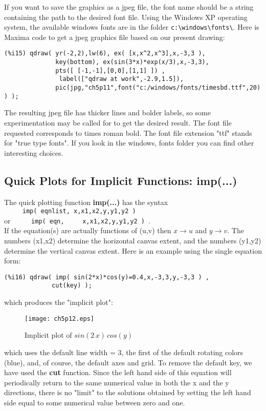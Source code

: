 \documentclass[12pt]{article}
\begin{document}
\smallskip
If you want to save the graphics as a jpeg file, the font name should be
  a string containing the path to the desired font file.
Using the Windows XP operating system, the available windows fonts are in
  the folder \verb|c:\windows\fonts\|.
Here is Maxima code to get a jpeg graphics file based on our present drawing:
\small
\begin{verbatim}
(%i15) qdraw( yr(-2,2),lw(6), ex( [x,x^2,x^3],x,-3,3 ),
              key(bottom), ex(sin(3*x)*exp(x/3),x,-3,3),
              pts([ [-1,-1],[0,0],[1,1] ]) ,
               label(["qdraw at work",-2.9,1.5]),
              pic(jpg,"ch5p11",font("c:/windows/fonts/timesbd.ttf",20) ) );
\end{verbatim}
\normalsize
The resulting jpeg file has thicker lines and bolder labels, so some experimentation
  may be called for to get the desired result.
The font file requested corresponds to times roman bold.
The font file extension "ttf" stands for "true type fonts".
If you look in the windows, fonts folder you can find other interesting
  choices.
\newpage

\subsection{Quick Plots for Implicit Functions: imp(...) }
The quick plotting function \textbf{imp(...)} has the syntax\\
\verb|     imp( eqnlist, x,x1,x2,y,y1,y2 ) | \\
 or \verb|     imp( eqn,     x,x1,x2,y,y1,y2 ) |.\\
If the equation(s) are actually functions of (u,v) then $x \rightarrow u$ and
  $y \rightarrow v$.
The numbers (x1,x2) determine the horizontal canvas extent, and the
  numbers (y1,y2) determine the vertical canvas extent.
\smallskip
Here is an example using the single equation form:
\small
\begin{verbatim}
(%i16) qdraw( imp( sin(2*x)*cos(y)=0.4,x,-3,3,y,-3,3 ) ,
             cut(key) );
\end{verbatim}
\normalsize
which produces the "implicit plot":

\begin{figure} [h]
   \centerline{\texttt{[image: ch5p12.eps]} }
	\caption{ Implicit plot of $sin(2\,x)\,cos(y)$ }
\end{figure}      
which uses the default line width = 3, the first of the default rotating colors (blue),
  and, of course, the default axes and grid.
To remove the default key, we have used the \textbf{cut} function.
Since the left hand side of this equation will periodically return to the
  same numerical value in both the x and the y directions, there is no "limit" to
  the solutions obtained by setting the left hand side equal to some numerical
  value between zero and one.
\end{document}
